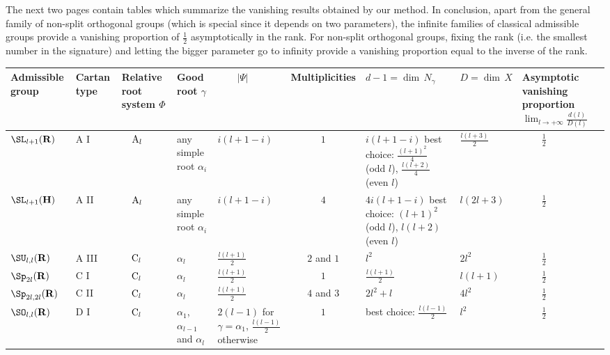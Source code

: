 The next two pages contain tables which summarize the vanishing results obtained by our method. In conclusion, apart from the general family of non-split orthogonal groups (which is special since it depends on two parameters), the infinite families of classical admissible groups provide a vanishing proportion of $\frac{1}{2}$ asymptotically in the rank. For non-split orthogonal groups, fixing the rank (i.e. the smallest number in the signature) and letting the bigger parameter go to infinity provide a vanishing proportion equal to the inverse of the rank.

\begin{landscape}
\renewcommand{\arraystretch}{1.32}
\begin{tabular}{| M{2cm} || M{1.2cm} | M{1.7cm} | M{1.3cm} | M{2cm} | c | M{2.7cm} | M{2.1cm} | M{2.8cm} |}
\hline

Admissible group & Cartan type & Relative root system $\Phi$ & Good root $\gamma$ & $\qquad |\Psi |$ & Multiplicities & $d-1 = {\dim} \, N_\gamma$ & $D = {\dim} \, X$ & Asymptotic vanishing proportion $\displaystyle \lim_{l \to +\infty} \scriptstyle \frac{d(l)}{D(l)}$ \tabularnewline
\hline

${\SL}_{l+1}({\bf R})$ & A I & $\quad{\rm A}_l$ & any simple root $\alpha_i$ & $i(l+1-i)$ & $1$ & $i(l+1-i)$ best choice: $\frac{(l+1)^2}{4}$ (odd $l$), $\frac{l(l+2)}{4}$ (even $l$) & $\displaystyle \frac{l(l+3)}{2}$ & $\qquad\frac{1}{2}$ \tabularnewline
\hline

${\SL}_{l+1}({\bf H})$ & A II & $\quad{\rm A}_l$ & any simple root $\alpha_i$ & $i(l+1-i)$ & $4$ & $4i(l+1-i)$ best choice: $\scriptstyle (l+1)^2$ (odd $l$), $\scriptstyle l(l+2)$ (even $l$) & $\displaystyle l(2l+3)$ & $\qquad\frac{1}{2}$ \tabularnewline
\hline

${\SU}_{l,l}({\bf R})$ & A III & $\quad{\rm C}_l$ & $\alpha_l$ & $\frac{l(l+1)}{2}$ & $2$ and $1$ & $l^2$ & $2l^2$ & $\qquad\frac{1}{2}$ \tabularnewline
\hline

${\Sp}_{2l}({\bf R})$ & C I & $\quad{\rm C}_l$ & $\alpha_l$ & $ \frac{l(l+1)}{2}$ & $1$ & $\frac{l(l+1)}{2}$ & $l(l+1)$ & $\qquad\frac{1}{2}$ \tabularnewline
\hline

${\Sp}_{2l,2l}({\bf R})$ & C II & $\quad{\rm C}_l$ & $\alpha_l$ & $\frac{l(l+1)}{2}$ & $4$ and $3$ & $2l^2+l$ & $4l^2$ & $\qquad\frac{1}{2}$ \tabularnewline
\hline

${\SO}_{l,l}({\bf R})$ & D I & $\quad{\rm C}_l$ & $\alpha_1$, $\alpha_{l-1}$ and $\alpha_l$ & $2(l-1)$ for $\gamma = \alpha_1$, $\frac{l(l-1)}{2}$ otherwise & $1$ & best choice: $\frac{l(l-1)}{2}$ & $l^2$ & $\qquad\frac{1}{2}$ \tabularnewline
\hline


\end{tabular}
\end{landscape}
